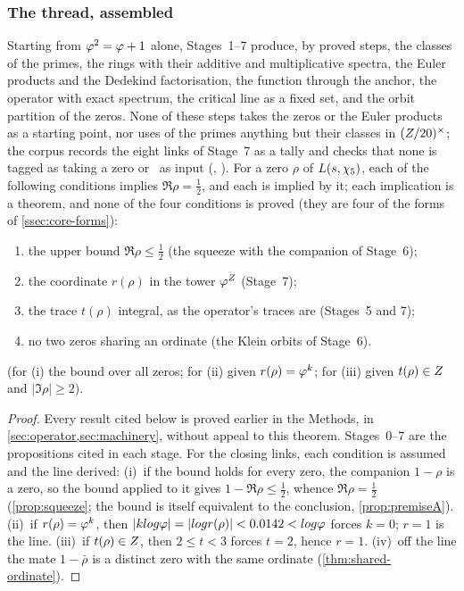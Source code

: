 \subsubsection{The thread, assembled}\label{ssec:thread}

\begin{theorem}\label{thm:topological-proof}
Starting from $\varphi^2=\varphi+1$ alone, Stages~1--7 produce, by proved steps, the
classes of the primes, the rings with their additive and multiplicative spectra, the
Euler products and the Dedekind factorisation, the function through the anchor, the
operator with exact spectrum, the critical line as a fixed set, and the orbit
partition of the zeros.  None of these steps takes the zeros or the Euler products as a
starting point, nor uses of the primes anything but their classes in $(Z/20)^{\times}$; the
corpus records the eight links of Stage~7 as a tally and checks that none is tagged as
taking a zero or \Ecore\ as input (,
).  For a zero $\rho$ of $L(s,\chi_5)$, each of
the following conditions implies $\Re\rho=\tfrac12$, and each is implied by it; each
implication is a theorem, and none of the four conditions is proved (they are four of the
forms of \cref{ssec:core-forms}):
\begin{enumerate}[label=\textup{(\roman*)}]
  \item the upper bound $\Re\rho\le\tfrac12$ (the squeeze with the companion of
    Stage~6);
  \item the coordinate $r(\rho)$ in the tower $\varphi^{Z}$ (Stage~7);
  \item the trace $t(\rho)$ integral, as the operator's traces are (Stages~5 and 7);
  \item no two zeros sharing an ordinate (the Klein orbits of Stage~6).
\end{enumerate}
\leavevmode{}%
(for (i) the bound over all zeros; for (ii) given $r(\rho)=\varphi^k$; for (iii)
given $t(\rho)\in Z$ and $|\Im\rho|\ge2$).
\end{theorem}

\begin{proof} Every result cited below is proved earlier in the Methods, in \cref{sec:operator,sec:machinery}, without appeal to this theorem.
Stages~0--7 are the propositions cited in each stage.  For the closing links, each
condition is assumed and the line derived:
(i)~if the bound holds for every zero, the companion $1-\rho$ is a zero, so the bound applied to it gives
$1-\Re\rho\le\tfrac12$, whence $\Re\rho=\tfrac12$ (\cref{prop:squeeze}; the bound is
itself equivalent to the conclusion, \cref{prop:premiseA}).
(ii)~if $r(\rho)=\varphi^k$, then $|klog\varphi|=|log r(\rho)|<0.0142<log\varphi$
forces $k=0$; $r=1$ is the line.
(iii)~if $t(\rho)\in Z$, then $2\le t<3$ forces $t=2$, hence $r=1$.
(iv)~off the line the mate $1-\bar\rho$ is a distinct zero with the same ordinate
(\cref{thm:shared-ordinate}).
\end{proof}

